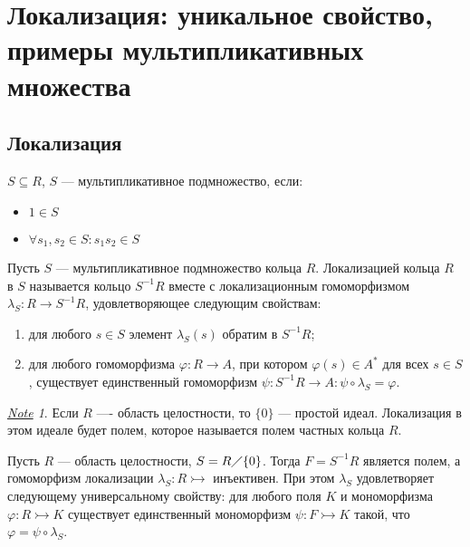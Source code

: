 \documentclass[11pt]{book}
\newcommand{\po}{\diagup}
\theoremstyle{definition}
\theoremstyle{plain}
\theoremstyle{plain}
\newtheorem{lm}{Lemma}
\theoremstyle{definition}
\theoremstyle{remark}
\newtheorem*{note}{\underline{Note}}
\begin{document}
\section{Локализация: уникальное свойство, примеры мультипликативных множества}
\subsection{Локализация}
%
\begin{defn}
    $ S \subseteq R$, $ S$ --- мультипликативное подмножество, если:
    \begin{itemize}[noitemsep]
	\item $ 1 \in  S$ 
	    \item  $\forall s_1, s_2 \in  S: s_1 s_2 \in S$
    \end{itemize}
\end{defn}
\begin{defn}
    Пусть $ S$ --- мультипликативное подмножество кольца  $ R$. {\sf Локализацией кольца}  $ R$ в  $ S$ называется кольцо  $ S^{-1}R$ вместе с локализационным гомоморфизмом $ \lambda_S : R \to  S^{-1}R$, удовлетворяющее следующим свойствам:
    \begin{enumerate}[noitemsep,label={\rm (\arabic*)}]
	\item для любого $ s \in S  $ элемент $ \lambda_S(s) $ обратим в  $ S^{-1}R$;
	\item для любого гомоморфизма $ \varphi : R \to  A$, при котором $ \varphi (s) \in A^{*}$ для всех  $ s \in S$, существует единственный гомоморфизм $ \psi : S^{-1}R \to  A: \psi \circ \lambda_S = \varphi $.
    \end{enumerate}
\end{defn}
\begin{note}
    Если $ R$ ---- область целостности, то  $ \{0 \}$ --- простой идеал.
    Локализация в этом идеале будет полем, которое называется {\sf полем частных кольца $ R$}.
\end{note}
 \begin{thm}
     Пусть $ R$ --- область целостности, $ S = R \po \{0\}$. Тогда $ F = S^{-1}R$ является полем, а гомоморфизм локализации $ \lambda_S: R \rightarrowtail$ инъективен. При этом  $ \lambda_S$ удовлетворяет следующему универсальному свойству: для любого поля  $ K$ и мономорфизма  $ \varphi :R \rightarrowtail K$ существует единственный мономорфизм $ \psi: F \rightarrowtail K$ такой, что  $ \varphi  = \psi \circ \lambda_S$.
 \end{thm}
\end{document}
